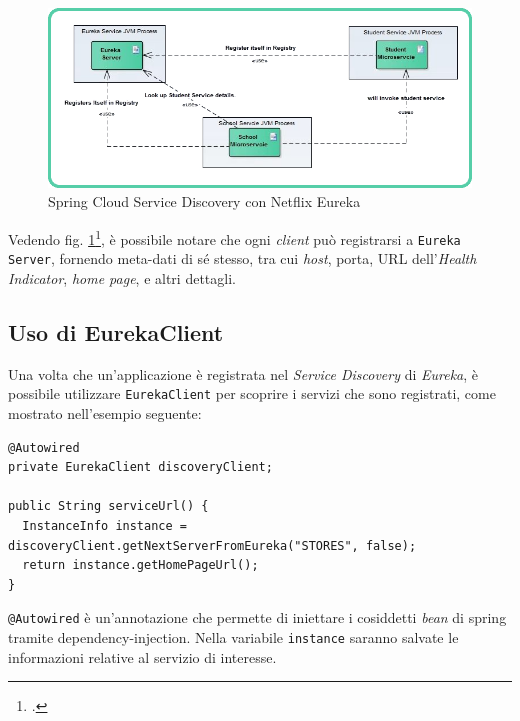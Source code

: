 \begin{figure}[H]
	\centering
	\includegraphics[width=\textwidth]{immagini/netflix-eureka.png}
	\caption[Spring Cloud Service Discovery con Netflix Eureka]{Spring Cloud Service Discovery con Netflix Eureka}
	\label{fig:netflix-eureka}
\end{figure}

Vedendo fig. \ref{fig:netflix-eureka}\footcite{site:fonte-netflix-eureka}, è possibile notare che ogni \textit{client} può registrarsi a \texttt{Eureka Server}, fornendo meta-dati di sé stesso, tra cui \textit{host}, porta, URL dell'\textit{Health Indicator}, \textit{home page}, e altri dettagli.

\subsection{Uso di EurekaClient} Una volta che un'applicazione è registrata nel \textit{Service Discovery} di \textit{Eureka}, è possibile utilizzare \texttt{EurekaClient} per scoprire i servizi che sono registrati, come mostrato nell'esempio seguente:

 \begin{tcolorbox}
 	\begin{lstlisting}
@Autowired
private EurekaClient discoveryClient;

public String serviceUrl() {
  InstanceInfo instance = discoveryClient.getNextServerFromEureka("STORES", false);
  return instance.getHomePageUrl();
}
 	\end{lstlisting}
 \end{tcolorbox}

\texttt{@Autowired} è un'annotazione che permette di iniettare i cosiddetti \textit{bean} di \gls{spring} tramite \gls{dependency-injection}. Nella variabile \texttt{instance} saranno salvate le informazioni relative al servizio di interesse.


